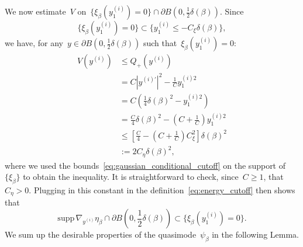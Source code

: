 \documentclass[10pt]{article}
\newcommand{\1}{\mathbbm 1}
\newcommand{\supp}{\mathrm{supp}}
\newcommand{\largeRadius}{\delta}
\newcommand{\gaussianCutoffConst}{C_\xi}
\begin{document}
                We now estimate~$V$ on~$\{\xi_\beta(y_1^{(i)})= 0\}\cap \partial B\left(0,\frac12\largeRadius(\beta)\right)$. Since
                $${\{\xi_\beta(y_1^{(i)}) = 0 \} \subset \{y_1^{(i)}\leq -C_\xi \largeRadius(\beta)\}},$$
                we have, for any~$y \in \partial B\left(0,\frac12\largeRadius(\beta)\right)$ such that~$\xi_\beta(y_1^{(i)}) =0$:
                \begin{equation}
                    \begin{aligned}
                        V(y^{(i)}) & \leq Q_+(y^{(i)})\\
                         &= C|y^{(i)\prime}|^2 - \frac1Cy_1^{(i)2}\\
                        &= C\left(\frac14\largeRadius(\beta)^2-y_1^{(i)2}\right)\\
                        &= \frac C4\largeRadius(\beta)^2 - \left(C + \frac1C\right)y_1^{(i)2}\\
                        &\leq \left[\frac{C}4 - \left(C+\frac1C\right)\gaussianCutoffConst^2\right]\largeRadius(\beta)^2\\
                        & := 2C_\eta \largeRadius(\beta)^2,
                    \end{aligned}
                \end{equation}
            where we used the bounds~\eqref{eq:gaussian_conditional_cutoff} on the support of~$\{\xi_\beta\}$ to obtain the inequality.
            It is straightforward to check, since~$C\geq 1$, that~$C_\eta >0$. Plugging in this constant in the definition~\eqref{eq:energy_cutoff} then shows that
            \[\supp\,\nabla_{y^{(i)}} \eta_\beta \cap \partial B\left(0,\frac12\largeRadius(\beta)\right) \subset \{\xi_\beta(y_1^{(i)})=0\}.\]
            We sum up the desirable properties of the quasimode~$\psi_\beta$ in the following Lemma.
\end{document}
